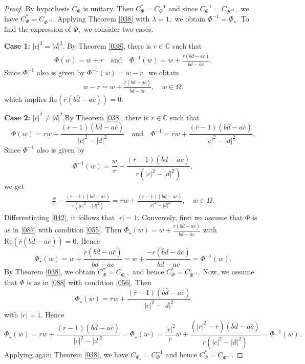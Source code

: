 \documentclass[11pt]{amsart}%
\theoremstyle{definition}
\theoremstyle{remark}
\numberwithin{equation}{section}
\begin{document}
\begin{proof}
By hypothesis $C_{\Phi}$ is unitary. Then $C_{\Phi}^{*}=C_{\Phi}^{-1}$ and
since $C_{\Phi}^{-1}=C_{\Phi^{-1}},$ we have $C_{\Phi}^{*}=C_{\Phi^{-1 }}.$
Applying Theorem \ref{038} with $\lambda=1,$ we obtain $\Phi^{-1}=\Phi_{\star
}.$ To find the expression of $\Phi,$ we consider two cases.

\textbf{Case 1:} $|c|^{2}=|d|^{2}.$ \newline By Theorem \ref{038}, there is
$r\in\mathbb{C}$ such that
\begin{align*}
\Phi(w)=w+r \quad\text{and} \quad\Phi^{-1}(w)= w+\frac{\overline{r}%
(b\overline{d}-a\overline{c})}{\overline{b}d-\overline{a}c}.
\end{align*}
Since $\Phi^{-1}$ also is given by $\Phi^{-1}(w)=w-r,$ we obtain
\begin{align*}
w-r= w+ \frac{\overline{r}(b\overline{d}-a\overline{c})}{\overline
{b}d-\overline{a}c}, \quad w\in\Omega.
\end{align*}
which implies $\mathrm{Re}(\overline{r}(b\overline{d}-a\overline{c}))=0.$

\textbf{Case 2:} $|c|^{2}\neq|d|^{2}.$\newline By Theorem \ref{038}, there is
$r\in\mathbb{C}$ such that
\[
\Phi(w)=rw+\frac{(r-1)(b\overline{d}-a\overline{c})}{|c|^{2}-|d|^{2}}%
\quad\text{and}\quad\Phi^{-1}=\overline{r}w+\frac{(\overline{r}-1)(b\overline
{d}-a\overline{c})}{|c|^{2}-|d|^{2}}.
\]
Since $\Phi^{-1}$ also is given by
\[
\Phi^{-1}(w)=\frac{w}{r}-\frac{(r-1)(b\overline{d}-a\overline{c})}%
{r(|c|^{2}-|d|^{2})},
\]
we get
\begin{align}
\label{042}\frac{w}{r}-\frac{(r-1)(b\overline{d}-a\overline{c})}%
{r(|c|^{2}-|d|^{2})}=\overline{r}w+\frac{(\overline{r}-1)(b\overline
{d}-a\overline{c})}{|c|^{2}-|d|^{2}},\quad w\in\Omega.
\end{align}
Differentiating \eqref{042}, it follows that $|r|=1.$ \newline Conversely,
first we assume that $\Phi$ is as in \eqref{087} with condition \eqref{055}.
Then $\Phi_{\star}(w)=w+\frac{\overline{r}(b\overline{d}-a\overline{c}%
)}{\overline{b}d-\overline{a}c}$ with $\mathrm{Re}(\overline{r}(b\overline
{d}-a\overline{c}))=0.$ Hence
\[
\Phi_{\star}(w)=w+\frac{\overline{r}(b\overline{d}-a\overline{c})}%
{\overline{b}d-\overline{a}c}=w+\frac{-r(\overline{b}d-\overline{a}%
c)}{\overline{b}d-\overline{a}c}=\Phi^{-1}(w).
\]
By Theorem \ref{038}, we obtain $C_{\Phi}^{\ast}=C_{\Phi_{\star}},$ and hence
$C_{\Phi}^{\ast}=C_{\Phi^{-1}}.$ Now, we assume that $\Phi$ is as in
\eqref{088} with condition \eqref{056}. Then
\[
\Phi_{\star}(w)=\overline{r}w+\frac{(\overline{r}-1)(b\overline{d}%
-a\overline{c})}{|c|^{2}-|d|^{2}}%
\]
with $|r|=1.$ Hence
\[
\Phi_{\star}(w)=\overline{r}w+\frac{(\overline{r}-1)(b\overline{d}%
-a\overline{c})}{|c|^{2}-|d|^{2}}=\Phi_{\star}(w)=\frac{|r|^{2}}{\overline{r}%
}w+\frac{(|r|^{2}-r)(b\overline{d}-a\overline{c})}{r(|c|^{2}-|d|^{2})}%
=\Phi^{-1}(w).
\]
Applying again Theorem \ref{038}, we have $C_{\Phi_{\star}}=C_{\Phi}^{-1}$
and hence $C_{\Phi}^{\ast}=C_{\Phi^{-1}}.$
\end{proof}
\end{document}
